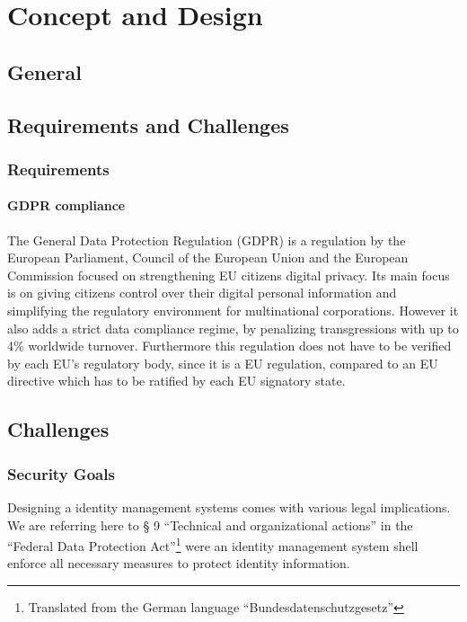 
\chapter{Concept and Design}
\label{cha:conceptanddesign}

\section{General}

\section{Requirements and Challenges}

\subsection{Requirements}

\subsubsection{GDPR compliance}
\label{subsubsec:GDPR_compliance}
The General Data Protection Regulation (GDPR) is a regulation by the European Parliament, Council of the European Union and the European Commission focused on strengthening EU citizens digital privacy.  Its main focus is on giving citizens control over their digital personal information and simplifying the regulatory environment for multinational corporations. However it also adds a strict data compliance regime, by penalizing transgressions with up to 4\% worldwide turnover\cite{gdpr}. Furthermore this regulation does not have to be verified by each EU's regulatory body, since it is a EU regulation, compared to an EU directive which has to be ratified by each EU signatory state.

\section{Challenges}
\label{sec:challenges}

\subsection{Security Goals}
\label{sec:securityGoals}

Designing a identity management systems comes with various legal implications. We are referring here to § 9 “Technical and organizational actions” in the “Federal Data Protection Act”\footnote{Translated from the German language “Bundesdatenschutzgesetz”} were an identity management system shell enforce all necessary measures to protect identity information.\cite{bdsg}


